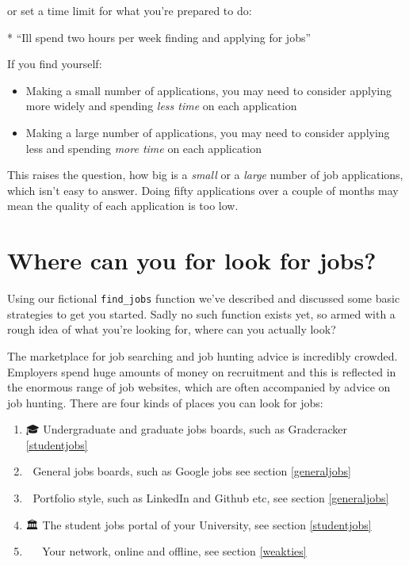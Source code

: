 \documentclass[
]{book}
\newenvironment{Shaded}{\begin{snugshade}}{\end{snugshade}}
\newcommand{\NormalTok}[1]{#1}
\newcommand{\SpecialStringTok}[1]{\textcolor[rgb]{0.31,0.60,0.02}{#1}}
\providecommand{\tightlist}{%
  \setlength{\itemsep}{0pt}\setlength{\parskip}{0pt}}
\begin{document}
or set a time limit for what you're prepared to do:

\begin{Shaded}
\begin{Highlighting}[]
\SpecialStringTok{* }\NormalTok{“I\textquotesingle{}ll spend two hours per week finding and applying for jobs”}
\end{Highlighting}
\end{Shaded}

If you find yourself:

\begin{itemize}
\tightlist
\item
  Making a small number of applications, you may need to consider applying more widely and spending \emph{less time} on each application
\item
  Making a large number of applications, you may need to consider applying less and spending \emph{more time} on each application
\end{itemize}

This raises the question, how big is a \emph{small} or a \emph{large} number of job applications, which isn't easy to answer. Doing fifty applications over a couple of months may mean the quality of each application is too low.

\hypertarget{looking}{%
\section{Where can you for look for jobs?}\label{looking}}

Using our fictional \texttt{find\_jobs} function we've described and discussed some basic strategies to get you started. Sadly no such function exists yet, so armed with a rough idea of what you're looking for, where can you actually look?

The marketplace for job searching and job hunting advice is incredibly crowded. Employers spend huge amounts of money on recruitment and this is reflected in the enormous range of job websites, which are often accompanied by advice on job hunting. There are four kinds of places you can look for jobs:

\begin{enumerate}
\def\labelenumi{\arabic{enumi}.}
\tightlist
\item
  🎓 Undergraduate and graduate jobs boards, such as Gradcracker \ref{studentjobs}
\item
  👀 General jobs boards, such as Google jobs see section \ref{generaljobs}
\item
  🎨 Portfolio style, such as LinkedIn and Github etc, see section \ref{generaljobs}
\item
  🏛️ The student jobs portal of your University, see section \ref{studentjobs}
\item
  👩‍👩‍👧‍👦 Your network, online and offline, see section \ref{weakties}
\end{enumerate}
\end{document}
